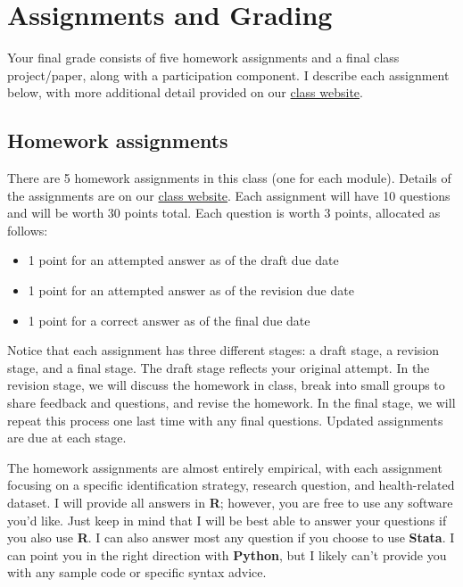 \documentclass[11pt,]{article}
\providecommand{\tightlist}{%
  \setlength{\itemsep}{0pt}\setlength{\parskip}{0pt}}
\begin{document}
\hypertarget{assignments-and-grading}{%
\section{Assignments and Grading}\label{assignments-and-grading}}

Your final grade consists of five homework assignments and a final class
project/paper, along with a participation component. I describe each
assignment below, with more additional detail provided on our
\href{https://econ470s23.classes.ianmccarthyecon.com/}{class website}.

\hypertarget{homework-assignments}{%
\subsection{Homework assignments}\label{homework-assignments}}

There are 5 homework assignments in this class (one for each module).
Details of the assignments are on our
\href{https://econ470s23.classes.ianmccarthyecon.com/}{class website}.
Each assignment will have 10 questions and will be worth 30 points
total. Each question is worth 3 points, allocated as follows:

\begin{itemize}
\tightlist
\item
  1 point for an attempted answer as of the draft due date
\item
  1 point for an attempted answer as of the revision due date
\item
  1 point for a correct answer as of the final due date
\end{itemize}

Notice that each assignment has three different stages: a draft stage, a
revision stage, and a final stage. The draft stage reflects your
original attempt. In the revision stage, we will discuss the homework in
class, break into small groups to share feedback and questions, and
revise the homework. In the final stage, we will repeat this process one
last time with any final questions. Updated assignments are due at each
stage.

The homework assignments are almost entirely empirical, with each
assignment focusing on a specific identification strategy, research
question, and health-related dataset. I will provide all answers in
\textbf{R}; however, you are free to use any software you'd like. Just
keep in mind that I will be best able to answer your questions if you
also use \textbf{R}. I can also answer most any question if you choose
to use \textbf{Stata}. I can point you in the right direction with
\textbf{Python}, but I likely can't provide you with any sample code or
specific syntax advice.
\end{document}
